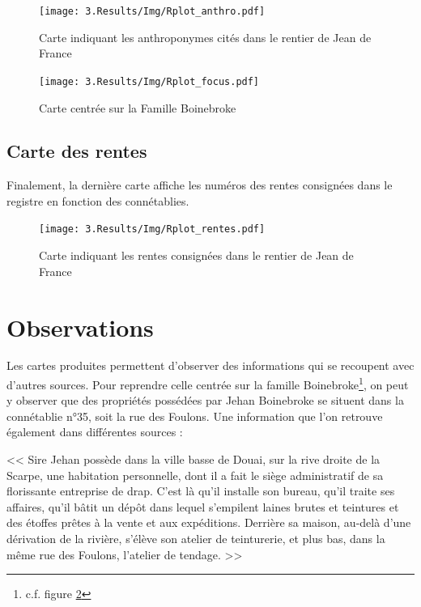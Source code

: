 \begin{figure}
    \centering
    \texttt{[image: 3.Results/Img/Rplot\_anthro.pdf]}
    \caption{Carte indiquant les anthroponymes cités dans le rentier de Jean de France}
    \label{fig:mapAnthro}
\end{figure}

\begin{figure}
    \centering
    \texttt{[image: 3.Results/Img/Rplot\_focus.pdf]}
    \caption{Carte centrée sur la Famille Boinebroke}
    \label{fig:mapFocus}
\end{figure}

\subsection{Carte des rentes}
Finalement, la dernière carte affiche les numéros des rentes consignées dans le registre en fonction des connétablies.
\begin{figure}
    \centering
    \texttt{[image: 3.Results/Img/Rplot\_rentes.pdf]}
    \caption{Carte indiquant les rentes consignées dans le rentier de Jean de France}
    \label{fig:mapRente}
\end{figure}

\section{Observations}
Les cartes produites permettent d'observer des informations  qui se recoupent avec d'autres sources. Pour reprendre celle centrée sur la famille Boinebroke\footnote{c.f. figure \ref{fig:mapFocus}},  on peut y observer que des propriétés possédées par Jehan Boinebroke se situent dans la connétablie n°35, soit la rue des Foulons.
Une information que l'on retrouve également dans différentes sources :
\begin{displayquote}
    << Sire Jehan possède dans la ville basse de Douai, sur la rive droite de la Scarpe, une habitation personnelle, dont il a fait le siège administratif de sa florissante entreprise de drap. C'est là qu'il installe son bureau, qu'il traite ses affaires, qu'il bâtit un dépôt dans lequel s'empilent laines brutes et teintures et des étoffes prêtes à la vente et aux expéditions. Derrière sa maison, au-delà d'une dérivation de la rivière, s'élève son atelier de teinturerie, et plus bas, dans la même rue des Foulons, l'atelier de tendage. >> 
\end{displayquote} 

